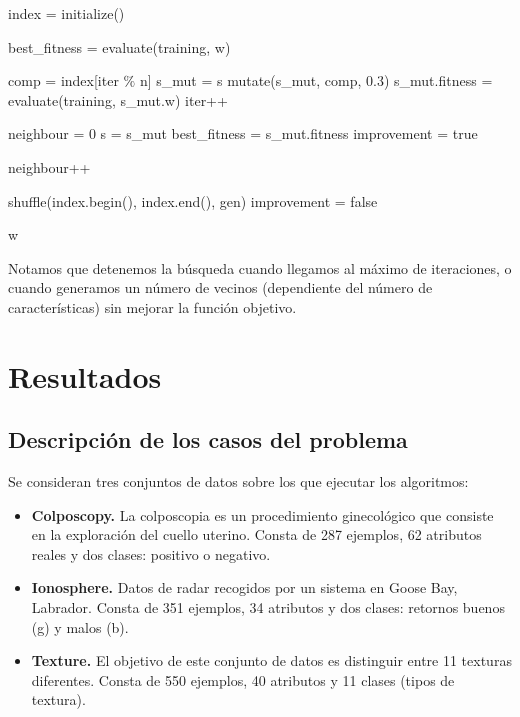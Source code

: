\documentclass[12pt]{article}
\begin{document}
\begin{algorithm}[ht!]
\begin{algorithmic}


\State index = initialize() 

\State best\_fitness = evaluate(training, w)

    \State comp = index[iter $\%$ n] 
    \State s\_mut = s
    \State mutate(s\_mut, comp, $0.3$)
    \State s\_mut.fitness = evaluate(training, s\_mut.w)
    \State iter++

      \State neighbour = $0$
      \State s = s\_mut
      \State best\_fitness = s\_mut.fitness
      \State improvement = true

    \Else
      \State neighbour++
    \EndIf

      \State shuffle(index.begin(), index.end(), gen)
      \State improvement = false
    \EndIf
  \EndWhile

\State \Return w
\EndFunction

\end{algorithmic}
\end{algorithm}

Notamos que detenemos la búsqueda cuando llegamos al máximo de iteraciones, o cuando generamos un número de vecinos (dependiente del número de características) sin mejorar la función objetivo.

\newpage
\section{Resultados}

\subsection*{Descripción de los casos del problema}
\label{casos}

Se consideran tres conjuntos de datos sobre los que ejecutar los algoritmos:

\begin{itemize}
	\item \textbf{Colposcopy.} La colposcopia es un procedimiento ginecológico que
consiste en la exploración del cuello uterino. Consta de 287 ejemplos, 62 atributos reales y dos clases: positivo o negativo.
    \item \textbf{Ionosphere.} Datos de radar recogidos por un sistema en Goose Bay, Labrador. Consta de 351 ejemplos, 34 atributos y dos clases: retornos buenos (g) y malos (b).
    \item \textbf{Texture.} El objetivo de este conjunto de datos es distinguir entre 11
texturas diferentes. Consta de 550 ejemplos, 40 atributos y 11 clases (tipos de textura).
\end{itemize}
\end{document}
